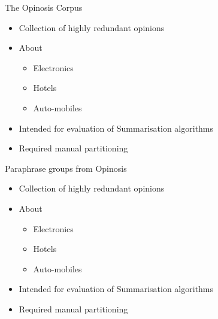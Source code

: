\documentclass[12pt,landscape,english]{beamer}
\begin{document}
\begin{frame}{The Opinosis Corpus}
	\begin{itemize}
		\item Collection of highly redundant opinions
		\item About \begin{itemize}
			\item Electronics
			\item Hotels
			\item Auto-mobiles
		\end{itemize}
		
		\item Intended for evaluation of Summarisation algorithms
		\item Required manual partitioning
	\end{itemize}
\end{frame}


\begin{frame}{Paraphrase groups from Opinosis}
	\begin{itemize}
		\item Collection of highly redundant opinions
		\item About \begin{itemize}
			\item Electronics
			\item Hotels
			\item Auto-mobiles
		\end{itemize}
		
		\item Intended for evaluation of Summarisation algorithms
		\item Required manual partitioning
	\end{itemize}
\end{frame}
\end{document}
